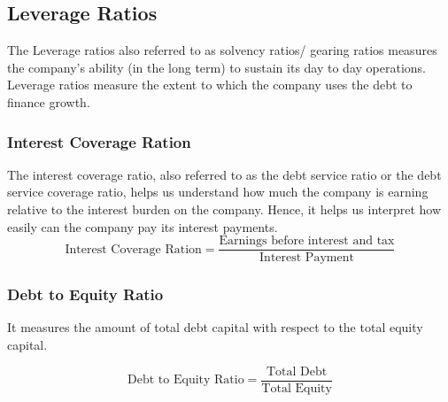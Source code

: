 
\subsection{Leverage Ratios}
The Leverage ratios also referred to as solvency ratios/ gearing ratios measures the company’s ability (in the long term) to sustain its day to day operations. Leverage ratios measure the extent to which the company uses the debt to finance growth.

\subsubsection{Interest Coverage Ration}
The interest coverage ratio, also referred to as the debt service ratio or the debt service coverage ratio, helps us understand how much the company is earning relative to the interest burden on the company. Hence, it helps us interpret how easily can the company pay its interest payments.
\begin{displaymath}
  \textrm{Interest Coverage Ration} = \frac{\textrm{Earnings before interest and tax}}{\textrm{Interest Payment}}
\end{displaymath}

\subsubsection{Debt to Equity Ratio}
It measures the amount of total debt capital with respect to the total equity capital.

\begin{displaymath}
  \textrm{Debt to Equity Ratio} = \frac{\textrm{Total Debt}}{\textrm{Total Equity}}
\end{displaymath}

